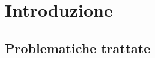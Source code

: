 \chapter{Introduzione}

\begin{citazione}

\end{citazione}
\newpage

\section{Problematiche trattate} { 

}